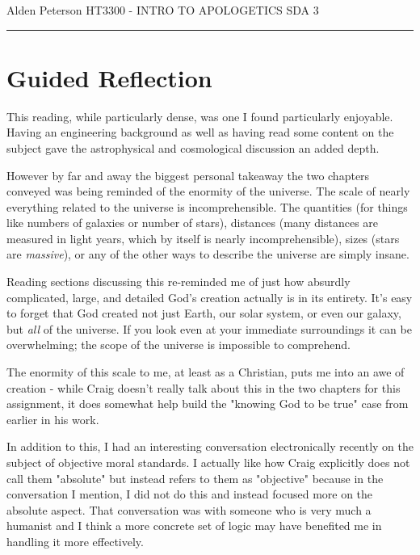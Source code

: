 \documentclass[12pt]{turabian-researchpaper}
\begin{document}
\begin{singlespace}
\noindent Alden Peterson \newline
\noindent HT3300 - INTRO TO APOLOGETICS \newline
\noindent SDA 3 \newline
\noindent\rule{4cm}{0.4pt}
\end{singlespace}

\section{Guided Reflection}

This reading, while particularly dense, was one I found particularly enjoyable. Having an engineering background as well as having read some content on the subject gave the astrophysical and cosmological discussion an added depth.

However by far and away the biggest personal takeaway the two chapters conveyed was being reminded of the enormity of the universe. The scale of nearly everything related to the universe is incomprehensible. The quantities (for things like numbers of galaxies or number of stars), distances (many distances are measured in light years, which by itself is nearly incomprehensible), sizes (stars are \textit{massive}), or any of the other ways to describe the universe are simply insane.

Reading sections discussing this re-reminded me of just how absurdly complicated, large, and detailed God's creation actually is in its entirety. It's easy to forget that God created not just Earth, our solar system, or even our galaxy, but \textit{all} of the universe. If you look even at your immediate surroundings it can be overwhelming; the scope of the universe is impossible to comprehend.

The enormity of this scale to me, at least as a Christian, puts me into an awe of creation - while Craig doesn't really talk about this in the two chapters for this assignment, it does somewhat help build the "knowing God to be true" case from earlier in his work.

In addition to this, I had an interesting conversation electronically recently on the subject of objective moral standards. I actually like how Craig explicitly does not call them "absolute" but instead refers to them as "objective" because in the conversation I mention, I did not do this and instead focused more on the absolute aspect.\autocite[pg.194]{craig2008reasonable} That conversation was with someone who is very much a humanist and I think a more concrete set of logic may have benefited me in handling it more effectively.
\end{document}
